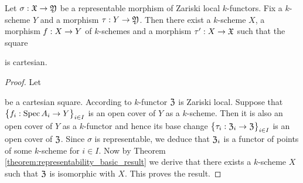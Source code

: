 \begin{proposition}\label{proposition:representable_are_representable_after_arbitrary_base_change}
Let $\sigma:{\mathfrak X}\rightarrow {\mathfrak Y}$ be a representable morphism of Zariski local $k$-functors. Fix a $k$-scheme $Y$ and a morphism $\tau:Y\rightarrow {\mathfrak Y}$. Then there exist a $k$-scheme $X$, a morphism $f:X\rightarrow Y$ of $k$-schemes and a morphism $\tau':X\rightarrow {\mathfrak X}$ such that the square
\begin{center}
\end{center}
is cartesian.
\end{proposition}
\begin{proof}
Let
\begin{center}
\end{center}
be a cartesian square. According to {\cite[Theorem 2.12]{Sheaves}} $k$-functor ${\mathfrak Z}$ is Zariski local. Suppose that $\big\{f_i:\mathrm{Spec}\, A_i\rightarrow Y\big\}_{i\in I}$ is an open cover of $Y$ as a $k$-scheme. Then it is also an open cover of $Y$ as a $k$-functor and hence its base change $\big\{\tau_i:{\mathfrak Z}_i\rightarrow {\mathfrak Z}\big\}_{i\in I}$ is an open cover of ${\mathfrak Z}$. Since $\sigma$ is representable, we deduce that ${\mathfrak Z}_i$ is a functor of points of some $k$-scheme for $i\in I$. Now by Theorem \ref{theorem:representability_basic_result} we derive that there exists a $k$-scheme $X$ such that ${\mathfrak Z}$ is isomorphic with $X$. This proves the result.
\end{proof}

